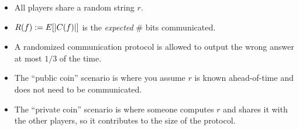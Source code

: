 \begin{itemize}
    \item All players share a random string $r$.
    \item $R(f) := E[\lvert C(f)\rvert]$ is the \emph{expected} \# bits communicated.
    \item A randomized communication protocol is allowed to output the wrong answer at most $1/3$ of the time.
    \item The ``public coin'' scenario is where you assume $r$ is known ahead-of-time and does not need to be communicated.
    \item The ``private coin'' scenario is where someone computes $r$ and shares it with the other players, so it contributes to the size of the protocol.
\end{itemize}
